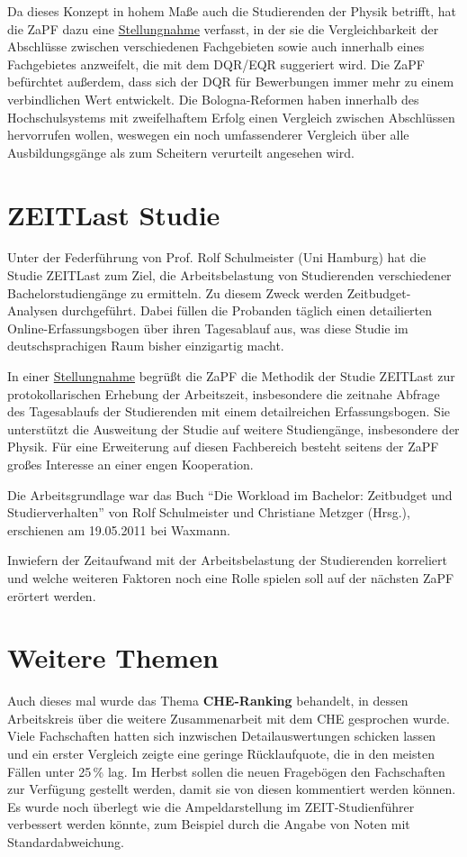 \documentclass{scrartcl}
\begin{document}
Da dieses Konzept in hohem Maße auch die Studierenden der Physik betrifft, hat die ZaPF dazu eine
\href{http://www.zapfev.de/resolutionen/sose11/Reso_EQR-DQR.pdf}{Stellungnahme} verfasst, in der sie die
Vergleichbarkeit der Abschlüsse
zwischen verschiedenen Fachgebieten sowie auch innerhalb eines Fachgebietes anzweifelt, die mit dem DQR/EQR suggeriert
wird. Die ZaPF befürchtet außerdem, dass sich der DQR für Bewerbungen immer mehr zu einem verbindlichen Wert entwickelt.
Die Bologna-Reformen haben innerhalb des Hochschulsystems mit zweifelhaftem Erfolg einen Vergleich zwischen Abschlüssen
hervorrufen wollen, weswegen ein noch umfassenderer Vergleich über alle Ausbildungsgänge als zum Scheitern verurteilt
angesehen wird. 


\section*{ZEITLast Studie}
\vspace{-12pt}
Unter der Federführung von Prof. Rolf Schulmeister (Uni Hamburg) hat die Studie ZEITLast zum Ziel, die Arbeitsbelastung
von Studierenden verschiedener Bachelorstudiengänge zu ermitteln. Zu diesem Zweck werden Zeitbudget-Analysen
durchgeführt. Dabei füllen die Probanden täglich einen detailierten Online-Erfassungsbogen über ihren Tagesablauf aus,
was diese Studie im deutschsprachigen Raum bisher einzigartig macht.

In einer \href{http://www.zapfev.de/resolutionen/sose11/Reso_ZEITlast.pdf}{Stellungnahme} begrüßt die ZaPF
die Methodik der Studie ZEITLast zur protokollarischen Erhebung der Arbeitszeit,
insbesondere die zeitnahe Abfrage des Tagesablaufs der Studierenden mit einem detailreichen Erfassungsbogen. Sie
unterstützt die Ausweitung der Studie auf weitere Studiengänge, insbesondere der Physik. Für eine Erweiterung auf diesen
Fachbereich besteht seitens der ZaPF großes Interesse an einer engen Kooperation.

Die Arbeitsgrundlage war das Buch “Die Workload im
Bachelor: Zeitbudget und Studierverhalten” von Rolf Schulmeister und Christiane Metzger (Hrsg.), erschienen am
19.05.2011 bei Waxmann.

Inwiefern der Zeitaufwand mit der Arbeitsbelastung der Studierenden korreliert und welche weiteren Faktoren noch eine
Rolle spielen soll auf der nächsten ZaPF erörtert werden.

\section*{Weitere Themen}
\vspace{-12pt}
Auch dieses mal wurde das Thema \textbf{CHE-Ranking} behandelt, in dessen Arbeitskreis über die weitere Zusammenarbeit
mit dem CHE
gesprochen wurde. Viele Fachschaften hatten sich inzwischen Detailauswertungen schicken lassen und ein erster Vergleich
zeigte eine geringe Rücklaufquote, die in den meisten Fällen unter 25\,\% lag. Im Herbst sollen die neuen Fragebögen den
Fachschaften zur Verfügung gestellt werden, damit sie von diesen kommentiert werden können. Es wurde noch überlegt wie
die Ampeldarstellung im ZEIT-Studienführer verbessert werden könnte, zum Beispiel durch die
Angabe von Noten mit Standardabweichung.
\end{document}
